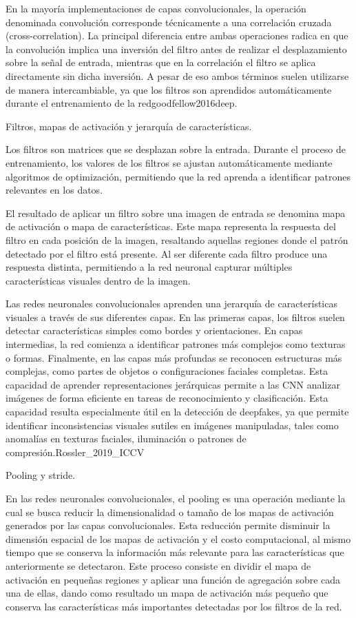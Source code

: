 En la mayoría implementaciones de capas convolucionales, la operación denominada convolución corresponde técnicamente a una correlación cruzada (cross-correlation). La principal diferencia entre ambas operaciones radica en que la convolución implica una inversión del filtro antes de realizar el desplazamiento sobre la señal de entrada, mientras que en la correlación el filtro se aplica directamente sin dicha inversión. A pesar de eso ambos términos suelen utilizarse de manera intercambiable, ya que los filtros son aprendidos automáticamente durante el entrenamiento de la redgoodfellow2016deep.

Filtros, mapas de activación y jerarquía de características.

Los filtros son matrices que se desplazan sobre la entrada. Durante el proceso de entrenamiento, los valores de los filtros se ajustan automáticamente mediante algoritmos de optimización, permitiendo que la red aprenda a identificar patrones relevantes en los datos.

El resultado de aplicar un filtro sobre una imagen de entrada se denomina mapa de activación o mapa de características. Este mapa representa la respuesta del filtro en cada posición de la imagen, resaltando aquellas regiones donde el patrón detectado por el filtro está presente. Al ser diferente cada filtro produce una respuesta distinta, permitiendo a la red neuronal capturar múltiples características visuales dentro de la imagen.

Las redes neuronales convolucionales aprenden una jerarquía de características visuales a través de sus diferentes capas. En las primeras capas, los filtros suelen detectar características simples como bordes y orientaciones. En capas intermedias, la red comienza a identificar patrones más complejos como texturas o formas. Finalmente, en las capas más profundas se reconocen estructuras más complejas, como partes de objetos o configuraciones faciales completas. Esta capacidad de aprender representaciones jerárquicas permite a las CNN analizar imágenes de forma eficiente en tareas de reconocimiento y clasificación.
Esta capacidad resulta especialmente útil en la detección de deepfakes, ya que permite identificar inconsistencias visuales sutiles en imágenes manipuladas, tales como anomalías en texturas faciales, iluminación o patrones de compresión.Rossler_2019_ICCV


Pooling y stride.

En las redes neuronales convolucionales, el pooling es una operación mediante la cual se busca reducir la dimensionalidad o tamaño de los mapas de activación generados por las capas convolucionales. Esta reducción permite disminuir la dimensión espacial de los mapas de activación y el costo computacional, al mismo tiempo que se conserva la información más relevante para las características que anteriormente se detectaron. Este proceso consiste en dividir el mapa de activación en pequeñas regiones y aplicar una función de agregación sobre cada una de ellas, dando como resultado un mapa de activación más pequeño que conserva las características más importantes detectadas por los filtros de la red.


